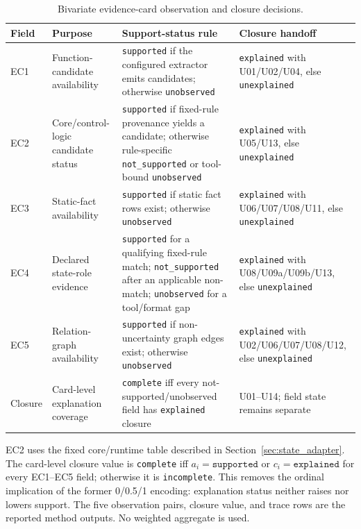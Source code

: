 \documentclass[a4paper,fleqn]{cas-dc}
\begin{document}
\begin{table}[t]
\centering
\normalsize
\caption{Bivariate evidence-card observation and closure decisions.}
\label{tab:s5_1}
\begin{tabularx}{\textwidth}{>{\raggedright\arraybackslash}p{}>{\raggedright\arraybackslash}p{}>{\raggedright\arraybackslash}X>{\raggedright\arraybackslash}p{}}
\toprule
Field & Purpose & Support-status rule & Closure handoff \\
\midrule
EC1 & Function-candidate availability & \texttt{supported} if the configured extractor emits candidates; otherwise \texttt{unobserved} & \texttt{explained} with U01/U02/U04, else \texttt{unexplained} \\
EC2 & Core/control-logic candidate status & \texttt{supported} if fixed-rule provenance yields a candidate; otherwise rule-specific \texttt{not\_supported} or tool-bound \texttt{unobserved} & \texttt{explained} with U05/U13, else \texttt{unexplained} \\
EC3 & Static-fact availability & \texttt{supported} if static fact rows exist; otherwise \texttt{unobserved} & \texttt{explained} with U06/U07/U08/U11, else \texttt{unexplained} \\
EC4 & Declared state-role evidence & \texttt{supported} for a qualifying fixed-rule match; \texttt{not\_supported} after an applicable non-match; \texttt{unobserved} for a tool/format gap & \texttt{explained} with U08/U09a/U09b/U13, else \texttt{unexplained} \\
EC5 & Relation-graph availability & \texttt{supported} if non-uncertainty graph edges exist; otherwise \texttt{unobserved} & \texttt{explained} with U02/U06/U07/U08/U12, else \texttt{unexplained} \\
Closure & Card-level explanation coverage & \texttt{complete} iff every not-supported/unobserved field has \texttt{explained} closure & U01--U14; field state remains separate \\
\bottomrule
\end{tabularx}
\end{table}

EC2 uses the fixed core/runtime table described in Section~\ref{sec:state_adapter}. The card-level closure value is \texttt{complete} iff $a_i=\texttt{supported}$ or $c_i=\texttt{explained}$ for every EC1--EC5 field; otherwise it is \texttt{incomplete}. This removes the ordinal implication of the former 0/0.5/1 encoding: explanation status neither raises nor lowers support. The five observation pairs, closure value, and trace rows are the reported method outputs. No weighted aggregate is used.
\end{document}
